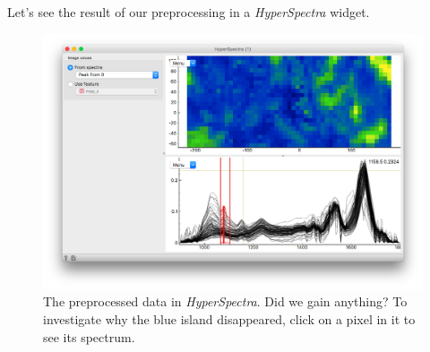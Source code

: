 Let's see the result of our preprocessing in a \textit{HyperSpectra} widget.

\begin{figure}[h]
    \vspace{-0.2cm}
    \includegraphics[scale=0.28]{graphics/ch-spectral_preprocessing/spectral_preprocessing-fig3.png}
    \vspace{-1cm}
    \caption{The preprocessed data in \textit{HyperSpectra}. Did we gain anything? To investigate why the blue island disappeared, click on a pixel in it to see its spectrum.}
    \label{fig:spectral_preprocessing-fig3}
\end{figure}
